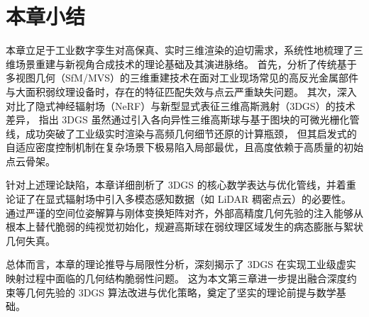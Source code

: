 
\section{本章小结}
\label{sec:chap2_summary}

本章立足于工业数字孪生对高保真、实时三维渲染的迫切需求，系统性地梳理了三维场景重建与新视角合成技术的理论基础及其演进脉络。
首先，分析了传统基于多视图几何（SfM/MVS）的三维重建技术在面对工业现场常见的高反光金属部件与大面积弱纹理设备时，存在的特征匹配失效与点云严重缺失问题。
其次，深入对比了隐式神经辐射场（NeRF）与新型显式表征三维高斯溅射（3DGS）的技术差异，
指出 3DGS 虽然通过引入各向异性三维高斯球与基于图块的可微光栅化管线，成功突破了工业级实时渲染与高频几何细节还原的计算瓶颈，
但其启发式的自适应密度控制机制在复杂场景下极易陷入局部最优，且高度依赖于高质量的初始点云骨架。

针对上述理论缺陷，本章详细剖析了 3DGS 的核心数学表达与优化管线，并着重论证了在显式辐射场中引入多模态感知数据（如 LiDAR 稠密点云）的必要性。
通过严谨的空间位姿解算与刚体变换矩阵对齐，外部高精度几何先验的注入能够从根本上替代脆弱的纯视觉初始化，规避高斯球在弱纹理区域发生的病态膨胀与絮状几何失真。

总体而言，本章的理论推导与局限性分析，深刻揭示了 3DGS 在实现工业级虚实映射过程中面临的几何结构脆弱性问题。
这为本文第三章进一步提出融合深度约束等几何先验的 3DGS 算法改进与优化策略，奠定了坚实的理论前提与数学基础。